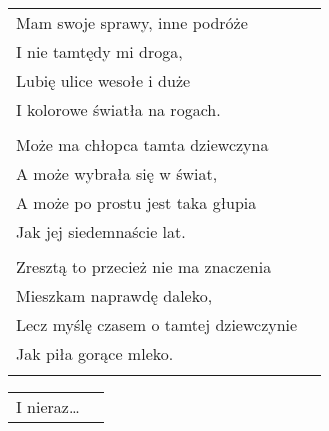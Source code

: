 \documentclass[a5paper]{article}
\begin{document}
\noindent
\begin{tabular}{@{}p{8.5cm}p{3cm}@{}}
Mam swoje sprawy, inne podróże\\
I nie tamtędy mi droga,\\
Lubię ulice wesołe i duże\\
I kolorowe światła na rogach.\\\\

Może ma chłopca tamta dziewczyna\\
A może wybrała się w świat,\\
A może po prostu jest taka głupia\\
Jak jej siedemnaście lat.\\\\

Zresztą to przecież nie ma znaczenia\\
Mieszkam naprawdę daleko,\\
Lecz myślę czasem o tamtej dziewczynie\\
Jak piła gorące mleko.\\\\
\end{tabular}

\noindent
\begin{tabular}{@{}p{8.5cm}p{3cm}@{}}
I nieraz…
\end{tabular}
\end{document}
